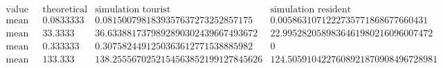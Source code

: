 \[\begin{array}{cccc}
 \text{value} & \text{theoretical} & \text{simulation tourist} & \text{simulation resident} \\
 \text{mean queue size} & 0.0833333 & 0.0815007981839357637273252857175 & 0.0058631071222735771868677660431 \\
 \text{mean queue time} & 33.3333 & 36.6338817379892890302439667493672 & 22.9952820589836461980216096007472 \\
 \text{mean system size} & 0.333333 & 0.3075824491250363612771538885982 & 0 \\
 \text{mean system time} & 133.333 & 138.2555670252154563852199127845626 & 124.5059104227608921870908496728981 \\
\end{array}\]

